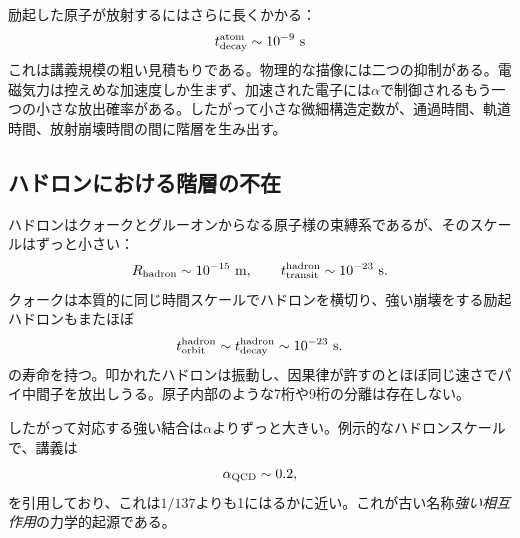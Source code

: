 励起した原子が放射するにはさらに長くかかる：
\begin{equation}
t_{\rm decay}^{\rm atom}\sim10^{-9}\ {\rm s}
\end{equation}
これは講義規模の粗い見積もりである。物理的な描像には二つの抑制がある。電磁気力は控えめな加速度しか生まず、加速された電子には\(\alpha\)で制御されるもう一つの小さな放出確率がある。したがって小さな微細構造定数が、通過時間、軌道時間、放射崩壊時間の間に階層を生み出す。

\subsection{ハドロンにおける階層の不在}

ハドロンはクォークとグルーオンからなる原子様の束縛系であるが、そのスケールはずっと小さい：
\begin{equation}
R_{\rm hadron}\sim10^{-15}\ {\rm m},
\qquad
t_{\rm transit}^{\rm hadron}\sim10^{-23}\ {\rm s}.
\end{equation}
クォークは本質的に同じ時間スケールでハドロンを横切り、強い崩壊をする励起ハドロンもまたほぼ
\begin{equation}
t_{\rm orbit}^{\rm hadron}
\sim t_{\rm decay}^{\rm hadron}
\sim10^{-23}\ {\rm s}.
\end{equation}
の寿命を持つ。叩かれたハドロンは振動し、因果律が許すのとほぼ同じ速さでパイ中間子を放出しうる。原子内部のような7桁や9桁の分離は存在しない。

\begin{classroomqa}
\end{classroomqa}

したがって対応する強い結合は\(\alpha\)よりずっと大きい。例示的なハドロンスケールで、講義は
\begin{equation}
\alpha_{\rm QCD}\sim0.2,
\end{equation}
を引用しており、これは\(1/137\)よりも1にはるかに近い。これが古い名称\emph{強い相互作用}の力学的起源である。

\begin{classroomqa}
\end{classroomqa}

